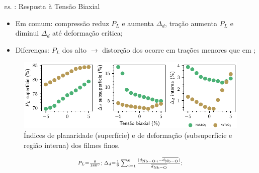 \begin{frame}{\texorpdfstring{}{NaNbO3} \textit{vs.} \texorpdfstring{}{NaTaO3}: Resposta à Tensão Biaxial}
	\begin{itemize}
		\item Em comum: compressão reduz $P_L$ e aumenta $\Delta_d$, tração aumenta $P_L$ e diminui $\Delta_d$ até deformação crítica;
		\item Diferenças: $P_L$ dos  alto $\to$ distorção dos  ocorre em \alert{trações menores} que em ;
	\end{itemize}
	\begin{figure}[t]
		\centering
		\includegraphics{../floats/geometry_tf_nt_nn/nn_nt_pl_baur_strain_evolution.pdf}
		\caption{Índices de planaridade (superfície) e de deformação (subsuperfície e região interna) dos filmes finos.\label{fig:pl_baur_strain_evolution_NTOvsNNO}}
	\end{figure}
	\begin{equation*}
		\scriptstyle{P_L = \frac{\theta}{\SI{180}{\degree}};\; \Delta_d = \frac{1}{6} \sum^{6}_{i=1} \frac{|d_{\ce{Nb-O}\, i} - \overline{d_{\ce{Nb-O}}}|}{\overline{d_{\ce{Nb-O}}}};}
	\end{equation*}
\end{frame}
